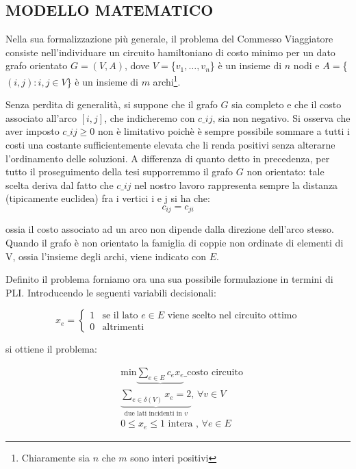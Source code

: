 \documentclass[11pt]{article}
\begin{document}
\subsection*{MODELLO MATEMATICO}

Nella sua formalizzazione più generale, il problema del Commesso Viaggiatore consiste nell'individuare un circuito hamiltoniano di costo minimo per un dato grafo orientato $G=(V,A)$, dove $V = $\{$ {v_1,\dots,v_n} $\}$ $ è un insieme di $n$ nodi e $A = $\{$ {(i,j): i, j \in V} $\}$ $ è un insieme di $m$ archi\footnote{Chiaramente sia $n$ che $m$ sono interi positivi}. 

Senza perdita di generalità, si suppone che il grafo $G$ sia completo e che il costo associato all'arco $[i,j]$, che indicheremo con $c\_{ij}$, sia non negativo. Si osserva che aver imposto $c\_{ij} \ge 0$ non è limitativo poichè è sempre possibile sommare a tutti i costi una costante sufficientemente elevata che li renda positivi senza alterarne l'ordinamento delle soluzioni. 
A differenza di quanto detto in precedenza, per tutto il proseguimento della tesi supporremmo il grafo $G$ non orientato: tale scelta deriva dal fatto che $c\_{ij}$ nel nostro lavoro rappresenta sempre la distanza (tipicamente euclidea) fra i vertici i e j si ha che:
$$c_{ij} = c_{ji}$$

ossia il costo associato ad un arco non dipende dalla direzione dell'arco stesso. Quando il grafo è non orientato la famiglia di coppie non ordinate di elementi di V, ossia l'insieme degli archi, viene indicato con $E$.


Definito il problema forniamo ora una sua possibile formulazione in termini di PLI. Introducendo le seguenti variabili decisionali:

\[
x_{e}=
\begin{cases}
1 & \text{se il lato $e \in E$ viene scelto nel circuito ottimo} \\
0 & \text{altrimenti}
\end{cases}
\]

si ottiene il problema:

\begin{eqnarray}
& \text{min}\displaystyle\underbrace{\sum_{e \in E} c_e x_e}\_{\text{costo circuito}} \\[1.5ex]
&\displaystyle\underbrace{\sum_{e \in \delta(V)} x_e = 2}_{\text{due lati incidenti in }v}\text{,  }\forall v \in V \\[1.5ex]
&0\leq x_e \leq 1 \text{ intera , }\forall e \in E
\end{eqnarray}
\end{document}
